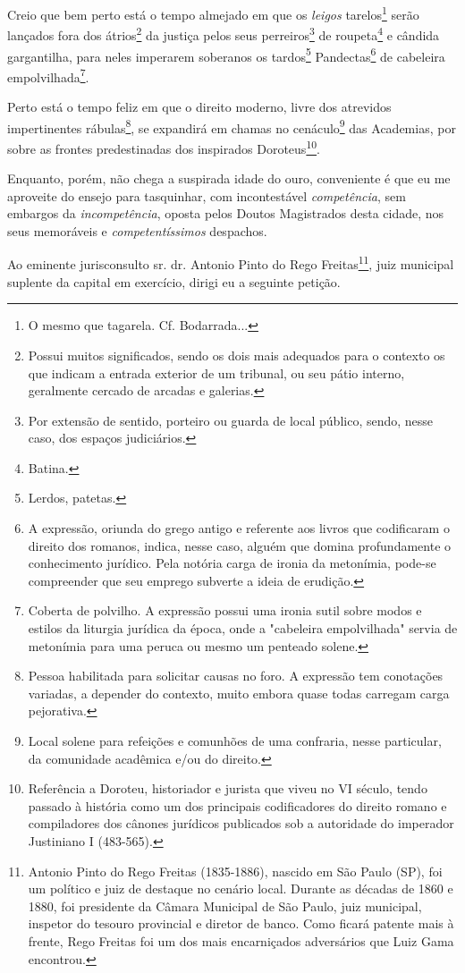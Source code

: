 Creio que bem perto está o tempo almejado em que os \emph{leigos}
tarelos\footnote{O mesmo que tagarela. Cf. Bodarrada...} serão
lançados fora dos átrios\footnote{Possui muitos significados, sendo os
  dois mais adequados para o contexto os que indicam a entrada exterior
  de um tribunal, ou seu pátio interno, geralmente cercado de arcadas e
  galerias.} da justiça pelos seus perreiros\footnote{Por extensão de
  sentido, porteiro ou guarda de local público, sendo, nesse caso, dos
  espaços judiciários.} de roupeta\footnote{Batina.} e cândida
gargantilha, para neles imperarem soberanos os tardos\footnote{Lerdos,
  patetas.} Pandectas\footnote{A expressão, oriunda do grego antigo e
  referente aos livros que codificaram o direito dos romanos, indica,
  nesse caso, alguém que domina profundamente o conhecimento jurídico.
  Pela notória carga de ironia da metonímia, pode-se compreender que seu
  emprego subverte a ideia de erudição.} de cabeleira
empolvilhada\footnote{Coberta de polvilho. A expressão possui uma
  ironia sutil sobre modos e estilos da liturgia jurídica da época, onde
  a "cabeleira empolvilhada" servia de metonímia para uma peruca ou
  mesmo um penteado solene.}.

Perto está o tempo feliz em que o direito moderno, livre dos atrevidos
impertinentes rábulas\footnote{Pessoa habilitada para solicitar causas
  no foro. A expressão tem conotações variadas, a depender do contexto,
  muito embora quase todas carregam carga pejorativa.}, se expandirá em
chamas no cenáculo\footnote{Local solene para refeições e comunhões de
  uma confraria, nesse particular, da comunidade acadêmica e/ou do
  direito.} das Academias, por sobre as frontes predestinadas dos
inspirados Doroteus\footnote{Referência a Doroteu, historiador e
  jurista que viveu no VI século, tendo passado à história como um dos
  principais codificadores do direito romano e compiladores dos cânones
  jurídicos publicados sob a autoridade do imperador Justiniano I
  (483-565).}.

Enquanto, porém, não chega a suspirada idade do ouro, conveniente é que
eu me aproveite do ensejo para tasquinhar, com incontestável
\emph{competência}, sem embargos da \emph{incompetência}, oposta pelos
Doutos Magistrados desta cidade, nos seus memoráveis e
\emph{competentíssimos} despachos.

Ao eminente jurisconsulto sr. dr. Antonio Pinto do Rego
Freitas\footnote{Antonio Pinto do Rego Freitas (1835-1886), nascido em
  São Paulo (SP), foi um político e juiz de destaque no cenário local.
  Durante as décadas de 1860 e 1880, foi presidente da Câmara Municipal
  de São Paulo, juiz municipal, inspetor do tesouro provincial e diretor
  de banco. Como ficará patente mais à frente, Rego Freitas foi um dos
  mais encarniçados adversários que Luiz Gama encontrou.}, juiz
municipal suplente da capital em exercício, dirigi eu a seguinte
petição.

